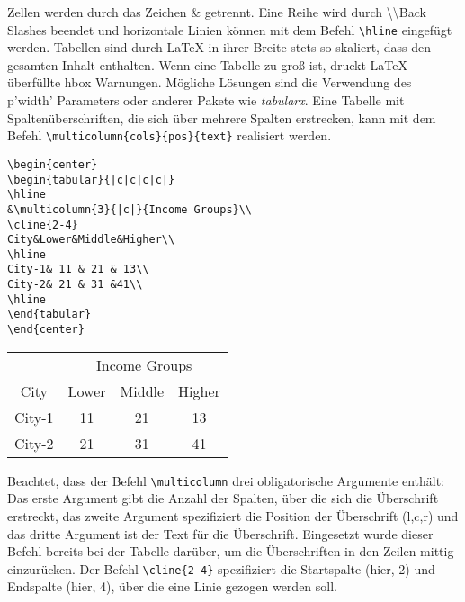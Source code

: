 Zellen werden durch das Zeichen \& getrennt. Eine Reihe wird durch \textbackslash\textbackslash Back Slashes beendet und horizontale Linien können mit dem Befehl \verb|\hline| eingefügt werden.
Tabellen sind durch \LaTeX{} in ihrer Breite stets so skaliert, dass den gesamten Inhalt enthalten. Wenn eine Tabelle zu groß ist, druckt \LaTeX{} überfüllte hbox Warnungen. Mögliche Lösungen sind die Verwendung des p{'width'} Parameters oder anderer Pakete wie \emph{tabularx}. Eine Tabelle mit Spaltenüberschriften, die sich über mehrere Spalten erstrecken, kann mit dem Befehl \verb|\multicolumn{cols}{pos}{text}| realisiert werden.

\begin{lstlisting}[style=Latex,caption={Einfache Tabelle mit Multicolumn},label=lst:tab2]
\begin{center}
\begin{tabular}{|c|c|c|c|}
\hline
&\multicolumn{3}{|c|}{Income Groups}\\
\cline{2-4}
City&Lower&Middle&Higher\\
\hline
City-1& 11 & 21 & 13\\
City-2& 21 & 31 &41\\
\hline
\end{tabular}
\end{center}
\end{lstlisting}

\begin{center}
	\begin{tabular}{|c|c|c|c|}
		\hline
		&\multicolumn{3}{|c|}{Income Groups}\\
		\cline{2-4}
		City&Lower&Middle&Higher\\
		\hline
		City-1& 11 & 21 & 13\\
		City-2& 21 & 31 &41\\
		\hline
	\end{tabular}
\end{center}
\bigskip

Beachtet, dass der Befehl \verb|\multicolumn| drei obligatorische Argumente enthält: Das erste Argument gibt die Anzahl der Spalten, über die sich die Überschrift erstreckt, das zweite Argument spezifiziert die Position der Überschrift (l,c,r) und das dritte Argument ist der Text für die Überschrift. Eingesetzt wurde dieser Befehl bereits bei der Tabelle darüber, um die Überschriften in den Zeilen mittig einzurücken. Der Befehl \verb|\cline{2-4}| spezifiziert die Startspalte (hier, 2) und Endspalte (hier, 4), über die eine Linie gezogen werden soll.


